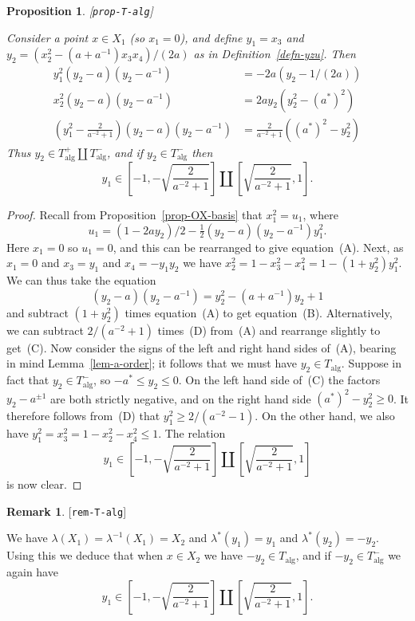 \documentclass[reqno]{amsart}
\newcommand{\lbl}[1]{\label{#1}\textup{[\texttt{#1}]}\par}
\newcommand{\lbl}{\label}
\newcommand{\alg}	{\operatorname{alg}}
\newcommand{\lm}        {\lambda}
\newcommand{\half}      {\tfrac{1}{2}}
\renewcommand{\:}{\colon}
\newtheorem{proposition}[theorem]{Proposition}
\theoremstyle{definition}
\newtheorem{remark}[theorem]{Remark}
\begin{document}
\begin{proposition}\lbl{prop-T-alg}
 Consider a point $x\in X_1$ (so $x_1=0$), and define
 $y_1=x_3$ and $y_2=(x_2^2-(a+a^{-1})x_3x_4)/(2a)$ as in
 Definition~\ref{defn-yzu}.  Then
 \begin{align*}
  y_1^2(y_2-a)(y_2-a^{-1}) &= -2a(y_2-1/(2a)) \tag{A} \\
  x_2^2(y_2-a)(y_2-a^{-1}) &= 2ay_2(y_2^2-(a^*)^2) \tag{B} \\
  \left(y_1^2-\frac{2}{a^{-2}+1}\right)(y_2-a)(y_2-a^{-1})
   &= \frac{2}{a^{-2}+1}((a^*)^2-y_2^2) \tag{C}
 \end{align*}
 Thus $y_2\in T_{\alg}^+\amalg T_{\alg}^-$, and if
 $y_2\in T_{\alg}^-$ then
 \[ y_1 \in \left[-1,-\sqrt{\frac{2}{a^{-2}+1}}\right] \amalg
            \left[\sqrt{\frac{2}{a^{-2}+1}},1\right].
 \]
\end{proposition}
\begin{proof}
 Recall from Proposition~\ref{prop-OX-basis} that $x_1^2=u_1$, where
 \[ u_1 = (1-2ay_2)/2 - \half(y_2-a)(y_2-a^{-1})y_1^2. \]
 Here $x_1=0$ so $u_1=0$, and this can be rearranged to give
 equation~(A).  Next, as $x_1=0$ and $x_3=y_1$ and $x_4=-y_1y_2$
 we have $x_2^2=1-x_3^2-x_4^2=1-(1+y_2^2)y_1^2$.  We can thus take the
 equation
 \[ (y_2-a)(y_2-a^{-1})=y_2^2-(a+a^{-1})y_2+1 \tag{D} \]
 and subtract $(1+y_2^2)$ times equation~(A) to get equation~(B).
 Alternatively, we can subtract $2/(a^{-2}+1)$ times~(D) from~(A) and
 rearrange slightly to get~(C).  Now consider the signs of the left
 and right hand sides of~(A), bearing in mind Lemma~\ref{lem-a-order};
 it follows that we must have $y_2\in T_{\alg}$.  Suppose in fact that
 $y_2\in T_{\alg}^-$, so $-a^*\leq y_2\leq 0$.  On the left hand side
 of~(C) the factors $y_2-a^{\pm 1}$ are both strictly negative, and
 on the right hand side $(a^*)^2-y_2^2\geq 0$.  It therefore follows
 from~(D) that $y_1^2\geq 2/(a^{-2}-1)$.  On the other hand, we also
 have $y_1^2=x_3^2=1-x_2^2-x_4^2\leq 1$.  The relation
 \[ y_1 \in \left[-1,-\sqrt{\frac{2}{a^{-2}+1}}\right] \amalg
            \left[\sqrt{\frac{2}{a^{-2}+1}},1\right]
 \]
 is now clear.
\end{proof}
\begin{remark}\lbl{rem-T-alg}
 We have $\lm(X_1)=\lm^{-1}(X_1)=X_2$ and $\lm^*(y_1)=y_1$ and
 $\lm^*(y_2)=-y_2$.  Using this we deduce that when $x\in X_2$ we have
 $-y_2\in T_{\alg}$, and if $-y_2\in T_{\alg}^-$ we again have
 \[ y_1 \in \left[-1,-\sqrt{\frac{2}{a^{-2}+1}}\right] \amalg
            \left[\sqrt{\frac{2}{a^{-2}+1}},1\right].
 \]
\end{remark}
\end{document}
